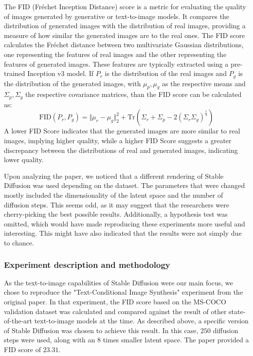 \documentclass[11pt]{article}
\begin{document}
The FID (Fréchet Inception Distance)\cite{heusel2018ganstrainedtimescaleupdate} score is a metric for evaluating the quality of images generated by generative or text-to-image models. It compares the distribution of generated images with the distribution of real images, providing a measure of how similar the generated images are to the real ones. The FID score calculates the Fréchet distance between two multivariate Gaussian distributions, one representing the features of real images and the other representing the features of generated images. These features are typically extracted using a pre-trained Inception v3 model. If $P_r$ is the distribution of the real images and $P_g$ is the distribution of the generated images, with $\mu_p, \mu_g$ as the respective means and $\Sigma_p, \Sigma_g$ the respective covariance matrices, than the FID score can be calculated as:
$$\mathrm{FID}(P_r, P_g) = \Vert\mu_r - \mu_g\Vert_2^2 + \mathrm{Tr}\left(\Sigma_r + \Sigma_p - 2 (\Sigma_r\Sigma_g)^\frac{1}{2}\right)$$
A lower FID Score indicates that the generated images are more similar to real images, implying higher quality, while a higher FID Score suggests a greater discrepancy between the distributions of real and generated images, indicating lower quality.

Upon analyzing the paper, we noticed that a different rendering of Stable Diffusion was used depending on the dataset. The parameters that were changed mostly included the dimensionality of the latent space and the number of diffusion steps. This seems odd, as it may suggest that the researchers were cherry-picking the best possible results. Additionally, a hypothesis test was omitted, which would have made reproducing these experiments more useful and interesting. This might have also indicated that the results were not simply due to chance.

\subsubsection{Experiment description and methodology}
As the text-to-image capabilities of Stable Diffusion were our main focus, we chose to reproduce the "Text-Conditional Image Synthesis" experiment from the original paper. In that experiment, the FID score based on the MS-COCO validation dataset\cite{lin2015microsoftcococommonobjects} was calculated and compared against the result of other state-of-the-art text-to-image models at the time. As described above, a specific version of Stable Diffusion was chosen to achieve this result. In this case, $250$ diffusion steps were used, along with an $8$ times smaller latent space. The paper provided a FID score of $23.31$.
\end{document}
